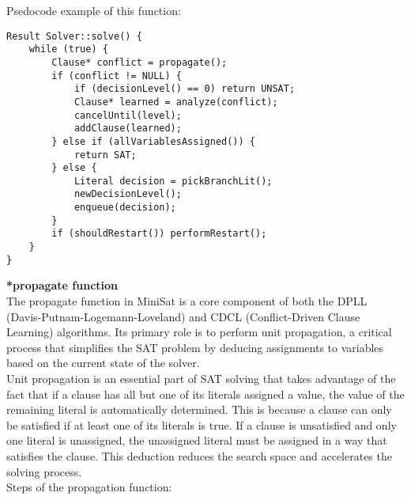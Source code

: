 \documentclass[runningheads]{llncs}
\begin{document}
Psedocode example of this function:
\begin{verbatim}
Result Solver::solve() {
    while (true) {
        Clause* conflict = propagate();
        if (conflict != NULL) {
            if (decisionLevel() == 0) return UNSAT;
            Clause* learned = analyze(conflict);
            cancelUntil(level);
            addClause(learned);
        } else if (allVariablesAssigned()) {
            return SAT;
        } else {
            Literal decision = pickBranchLit();
            newDecisionLevel();
            enqueue(decision);
        }
        if (shouldRestart()) performRestart();
    }
}
\end{verbatim}

\textbf{*propagate function}
\\
The propagate function in MiniSat is a core component of both the DPLL (Davis-Putnam-Logemann-Loveland) and CDCL (Conflict-Driven Clause Learning) algorithms. Its primary role is to perform unit propagation, a critical process that simplifies the SAT problem by deducing assignments to variables based on the current state of the solver.\\
Unit propagation is an essential part of SAT solving that takes advantage of the fact that if a clause has all but one of its literals assigned a value, the value of the remaining literal is automatically determined. This is because a clause can only be satisfied if at least one of its literals is true. If a clause is unsatisfied and only one literal is unassigned, the unassigned literal must be assigned in a way that satisfies the clause. This deduction reduces the search space and accelerates the solving process.
\\
Steps of the propagation function:
\end{document}
